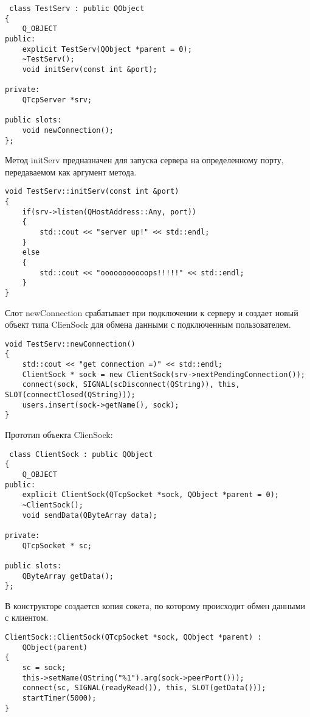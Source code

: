 \begin{lstlisting}
 class TestServ : public QObject
{
    Q_OBJECT
public:
    explicit TestServ(QObject *parent = 0);
    ~TestServ();
    void initServ(const int &port);

private:
    QTcpServer *srv;

public slots:
    void newConnection();
};
\end{lstlisting}

Метод initServ предназначен для запуска сервера на определенному порту, передаваемом как аргумент метода.

\begin{lstlisting}
void TestServ::initServ(const int &port)
{
    if(srv->listen(QHostAddress::Any, port))
    {
        std::cout << "server up!" << std::endl;
    }
    else
    {
        std::cout << "ooooooooooops!!!!!" << std::endl;
    }
}
\end{lstlisting}

Слот newConnection срабатывает при подключении к серверу и создает новый объект типа ClienSock для обмена данными с подключенным пользователем.

\begin{lstlisting}
void TestServ::newConnection()
{
    std::cout << "get connection =)" << std::endl;
    ClientSock * sock = new ClientSock(srv->nextPendingConnection());
    connect(sock, SIGNAL(scDisconnect(QString)), this, SLOT(connectClosed(QString)));
    users.insert(sock->getName(), sock);
}
\end{lstlisting}

Прототип объекта ClienSock:

\begin{lstlisting}
 class ClientSock : public QObject
{
    Q_OBJECT
public:
    explicit ClientSock(QTcpSocket *sock, QObject *parent = 0);
    ~ClientSock();
    void sendData(QByteArray data);
    
private:
    QTcpSocket * sc;

public slots:
    QByteArray getData();
};
\end{lstlisting}

В конструкторе создается копия сокета, по которому происходит обмен данными с клиентом.

\begin{lstlisting}
ClientSock::ClientSock(QTcpSocket *sock, QObject *parent) :
    QObject(parent)
{
    sc = sock;
    this->setName(QString("%1").arg(sock->peerPort()));
    connect(sc, SIGNAL(readyRead()), this, SLOT(getData()));
    startTimer(5000);
}
\end{lstlisting}

